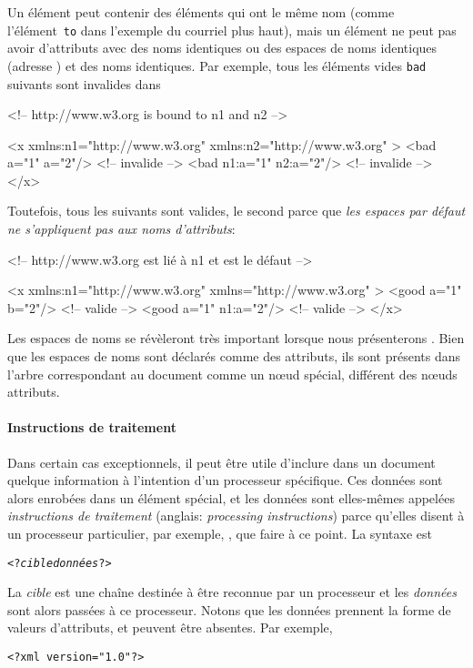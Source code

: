 

\noindent Un élément peut contenir des éléments qui ont le même nom
(comme l'élément~\texttt{to} dans l'exemple du courriel plus haut),
mais un élément ne peut pas avoir d'attributs avec des noms identiques
ou des espaces de noms identiques (adresse \HTTP) et des noms
identiques. Par exemple, tous les éléments vides \texttt{bad} suivants
sont invalides dans
\begin{sverb}
<!-- http://www.w3.org is bound to n1 and n2 -->

<x xmlns:n1="http://www.w3.org" xmlns:n2="http://www.w3.org" >
  <bad a="1"    a="2"/>     <!-- invalide -->
  <bad n1:a="1" n2:a="2"/>  <!-- invalide -->
</x>
\end{sverb}
Toutefois, tous les suivants sont valides, le second parce que
\emph{les espaces par défaut ne s'appliquent pas aux noms
  d'attributs}:
\begin{sverb}
<!-- http://www.w3.org est lié à n1 et est le défaut -->

<x xmlns:n1="http://www.w3.org" xmlns="http://www.w3.org" >
  <good a="1" b="2"/>    <!-- valide -->
  <good a="1" n1:a="2"/> <!-- valide -->
</x>
\end{sverb}
Les espaces de noms se révèleront très important lorsque nous
présenterons \XSLT. Bien que les espaces de noms sont déclarés comme
des attributs, ils sont présents dans l'arbre \XML correspondant au
document comme un nœud spécial, différent des nœuds attributs.

\paragraph{Instructions de traitement}

Dans certain cas exceptionnels, il peut être utile d'inclure dans un
document \XML quelque information à l'intention d'un processeur \XML
spécifique. Ces données sont alors enrobées dans un élément spécial,
et les données sont elles-mêmes appelées \emph{instructions de
  traitement} (anglais: \emph{processing instructions}) parce qu'elles
disent à un processeur particulier, par exemple, \Saxon, que faire à
ce point. La syntaxe est
\begin{alltt}
<?\textit{cible} \textit{données}?>
\end{alltt}
La \emph{cible} est une chaîne destinée à être reconnue par un
processeur et les \emph{données} sont alors passées à ce
processeur. Notons que les données prennent la forme de valeurs
d'attributs, et peuvent être absentes. Par exemple,
\begin{verbatim}
<?xml version="1.0"?>
\end{verbatim}

